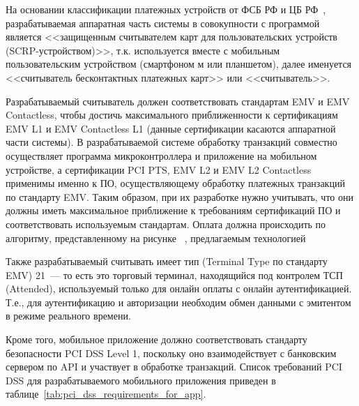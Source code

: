 На основании классификации платежных устройств от ФСБ РФ и ЦБ РФ~\cite{cbr_requirements}, разрабатываемая аппаратная часть системы в совокупности с программой является <<защищенным считывателем карт для пользовательских устройств (SCRP-устройством)>>, т.к. используется вместе с мобильным пользовательским устройством (смартфоном м или планшетом), далее именуется <<считыватель бесконтактных платежных карт>> или <<считыватель>>.

Разрабатываемый считыватель должен соответствовать стандартам EMV и EMV Contactless, чтобы достичь максимального приближенности к сертификациям EMV L1 и EMV Contactless L1 (данные сертификации касаются аппаратной части системы).
В разрабатываемой системе обработку транзакций совместно осуществляет программа микроконтроллера и приложение на мобильном устройстве, а сертификации PCI PTS, EMV L2 и EMV L2 Contactless применимы именно к ПО, осуществляющему обработку платежных транзакций по стандарту EMV.
Таким образом, при их разработке нужно учитывать, что они должны иметь максимальное приближение к требованиям сертификаций ПО и соответствовать используемым стандартам.
Оплата должна происходить по алгоритму, представленному на рисунке~ %
, предлагаемым технологией %

Также разрабатываемый считывать имеет тип (Terminal Type по стандарту EMV) 21~--- то есть это торговый терминал, находящийся под контролем ТСП (Attended), используемый только для онлайн оплаты с онлайн аутентификацией.
Т.е., для аутентификацию и авторизации необходим обмен данными с эмитентом в режиме реального времени.

Кроме того, мобильное приложение должно соответствовать стандарту безопасности PCI DSS Level 1, поскольку оно взаимодействует с банковским сервером по API и участвует в обработке транзакций.
Список требований PCI DSS для разрабатываемого мобильного приложения приведен в таблице~\ref{tab:pci_dss_requirements_for_app}.

